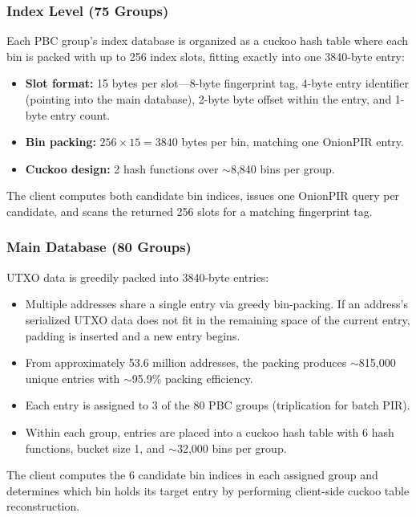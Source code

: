 \subsubsection{Index Level (75 Groups)}

Each PBC group's index database is organized as a cuckoo hash table where each bin is packed with up to 256 index slots, fitting exactly into one 3840-byte entry:
\begin{itemize}[nolistsep,leftmargin=*]
    \item \textbf{Slot format:} 15 bytes per slot---8-byte fingerprint tag, 4-byte entry identifier (pointing into the main database), 2-byte byte offset within the entry, and 1-byte entry count.
    \item \textbf{Bin packing:} $256 \times 15 = 3840$ bytes per bin, matching one OnionPIR entry.
    \item \textbf{Cuckoo design:} 2 hash functions over $\sim$8,840 bins per group.
\end{itemize}

The client computes both candidate bin indices, issues one OnionPIR query per candidate, and scans the returned 256 slots for a matching fingerprint tag.

\subsubsection{Main Database (80 Groups)}

UTXO data is greedily packed into 3840-byte entries:
\begin{itemize}[nolistsep,leftmargin=*]
    \item Multiple addresses share a single entry via greedy bin-packing. If an address's serialized UTXO data does not fit in the remaining space of the current entry, padding is inserted and a new entry begins.
    \item From approximately 53.6 million addresses, the packing produces $\sim$815,000 unique entries with $\sim$95.9\% packing efficiency.
    \item Each entry is assigned to 3 of the 80 PBC groups (triplication for batch PIR).
    \item Within each group, entries are placed into a cuckoo hash table with 6 hash functions, bucket size 1, and $\sim$32,000 bins per group.
\end{itemize}

The client computes the 6 candidate bin indices in each assigned group and determines which bin holds its target entry by performing client-side cuckoo table reconstruction.

